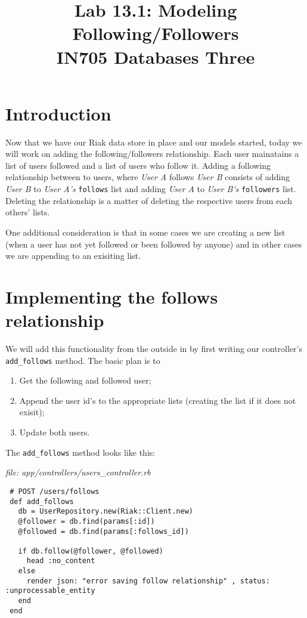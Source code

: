 \documentclass{article}
\begin{document}
\title{Lab 13.1: Modeling Following/Followers\\ IN705 Databases Three}
\date{}
\maketitle

\section*{Introduction}
Now that we have our Riak data store in place and our models started, today we will work on adding the following/followers relationship.  Each user mainatains a list of users followed and a list of users who follow it.  Adding a following relationship between to users, where \emph{User A} follows \emph{User B} consists of adding \emph{User B} to \emph{User A's} \texttt{follows} list and adding \emph{User A} to \emph{User B's} \texttt{followers} list.  Deleting the relationship is a matter of deleting the respective users from each others' lists.

One additional consideration is that in some cases we are creating a new list (when a user has not yet followed or been followed by anyone) and in other cases we are appending to an exisiting list.

\section{Implementing the follows relationship}
We will add this functionality from the outside in by first writing our controller's \texttt{add\_follows} method.  The basic plan is to

\begin{enumerate}
	\item Get the following and followed user;
	\item Append the user id's to the appropriate lists (creating the list if it does not exisit);
	\item Update both users.
\end{enumerate}

The \texttt{add\_follows} method looks like this:

\emph{file:  app/controllers/users\_controller.rb}

\begin{verbatim}
 # POST /users/follows
 def add_follows
   db = UserRepository.new(Riak::Client.new)
   @follower = db.find(params[:id])
   @followed = db.find(params[:follows_id])

   if db.follow(@follower, @followed)
     head :no_content
   else
     render json: "error saving follow relationship" , status: :unprocessable_entity
   end
 end

\end{verbatim}
\end{document}
